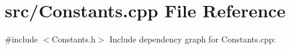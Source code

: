\section{src/\+Constants.cpp File Reference}
\label{_constants_8cpp}
{\ttfamily \#include $<$Constants.\+h$>$}\newline
Include dependency graph for Constants.\+cpp\+:
